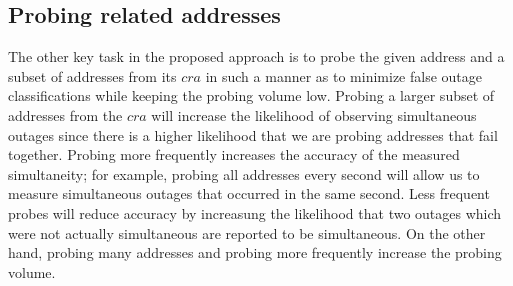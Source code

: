 


\subsection{Probing related addresses}

The other key task in the proposed approach is to probe the given
address and a subset of addresses from its $cra$ in such a manner as to
minimize false outage classifications while
keeping the probing volume low. Probing a larger subset of addresses
from the $cra$ will increase the likelihood of observing
simultaneous outages since there is a higher
likelihood that we are probing addresses that fail together. Probing more frequently
increases the accuracy of the measured simultaneity; for example,
probing all addresses every second will allow us to measure
simultaneous outages that occurred in the same second. Less frequent probes will
reduce accuracy by increasung the likelihood that two outages
which were not actually simultaneous are reported to be simultaneous. On the other hand, probing many addresses and
probing more frequently increase the probing volume. 

